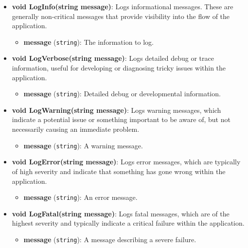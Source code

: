 \documentclass[12pt]{article}
\begin{document}
\begin{itemize}
    \item \textbf{void LogInfo(string message)}: Logs informational messages. These are generally non-critical messages that provide visibility into the flow of the application.
        \begin{itemize}
            \item \textbf{message} (\texttt{string}): The information to log.
        \end{itemize}

    \item \textbf{void LogVerbose(string message)}: Logs detailed debug or trace information, useful for developing or diagnosing tricky issues within the application.
        \begin{itemize}
            \item \textbf{message} (\texttt{string}): Detailed debug or developmental information.
        \end{itemize}

    \item \textbf{void LogWarning(string message)}: Logs warning messages, which indicate a potential issue or something important to be aware of, but not necessarily causing an immediate problem.
        \begin{itemize}
            \item \textbf{message} (\texttt{string}): A warning message.
        \end{itemize}

    \item \textbf{void LogError(string message)}: Logs error messages, which are typically of high severity and indicate that something has gone wrong within the application.
        \begin{itemize}
            \item \textbf{message} (\texttt{string}): An error message.
        \end{itemize}

    \item \textbf{void LogFatal(string message)}: Logs fatal messages, which are of the highest severity and typically indicate a critical failure within the application.
        \begin{itemize}
            \item \textbf{message} (\texttt{string}): A message describing a severe failure.
        \end{itemize}
\end{itemize}
\end{document}
